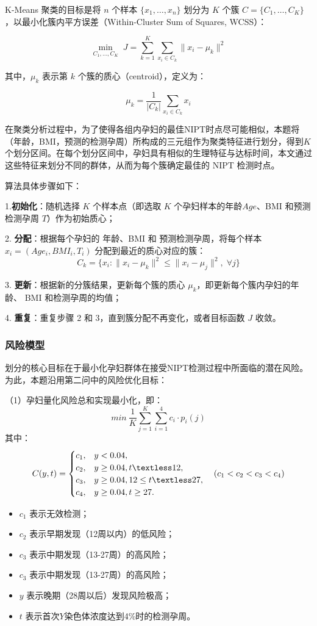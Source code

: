 \documentclass[12pt]{ctexart}
\begin{document}
	K-Means 聚类的目标是将 \(n\) 个样本 \(\{x_1, \dots, x_n\}\) 划分为 \(K\) 个簇 \(C = \{C_1, \dots, C_K\}\)，以最小化簇内平方误差（Within-Cluster Sum of Squares, WCSS）：
	
	\[
	\min_{C_1,\dots,C_K} \;
	J = \sum_{k=1}^K \sum_{x_i \in C_k} \|x_i - \mu_k\|^2
	\]
	
	其中，\(\mu_k\) 表示第 \(k\) 个簇的质心（centroid），定义为：
	
	\[
	\mu_k = \frac{1}{|C_k|}\sum_{x_i \in C_k} x_i
	\]
	
	
	在聚类分析过程中，为了使得各组内孕妇的最佳NIPT时点尽可能相似，本题将（年龄，BMI，预测的检测孕周）所构成的三元组作为聚类特征进行划分，得到$K$个划分区间。在每个划分区间中，孕妇具有相似的生理特征与达标时间，本文通过这些特征来划分不同的群体，从而为每个簇确定最佳的 NIPT 检测时点。
	
	算法具体步骤如下：
	
	1.\textbf{初始化}：随机选择 \(K\) 个样本点（即选取 \(K\) 个孕妇样本的年龄\(Age\)、BMI 和预测检测孕周 \(T\)）作为初始质心；
	
	2. \textbf{分配}：根据每个孕妇的 年龄、BMI 和 预测检测孕周，将每个样本 \(x_i = (Age_i,BMI_i, T_i)\) 分配到最近的质心对应的簇：
	\[
	C_k = \{x_i : \|x_i - \mu_k\|^2 \leq \|x_i - \mu_j\|^2, \;\forall j\}
	\]
	
	3. \textbf{更新}：根据新的分簇结果，更新每个簇的质心 \(\mu_k\)，即更新每个簇内孕妇的年龄、 BMI 和检测孕周的均值；
	
	4. \textbf{重复}：重复步骤 2 和 3，直到簇分配不再变化，或者目标函数 \(J\) 收敛。
	
	\subsubsection{风险模型}
	
	划分的核心目标在于最小化孕妇群体在接受NIPT检测过程中所面临的潜在风险。为此，本题沿用第二问中的风险优化目标：
	
	（1）孕妇量化风险总和实现最小化，即：
	\begin{equation}
		min\ \frac{1}{K}\sum_{j = 1}^{K} \sum_{i = 1}^{4}c_i \cdot p_i(j)
	\end{equation}
	其中：
	\[
	C(y,t) =
	\begin{cases}
		c_1, & y < 0.04, \\
		c_2, & y \geq 0.04 , t \textless 12, \\
		c_3, & y \geq 0.04 , 12 \le t \textless 27,\\
		c_4, & y \geq 0.04 ,  t \ge 27.
	\end{cases}
	\quad (c_1 < c_2 < c_3 < c_4)
	\]
	\begin{itemize}[noitemsep, topsep=0pt, parsep=0pt, partopsep=0pt, leftmargin=1.5em]
		\item $c_1$ 表示无效检测；
		\item $c_2$ 表示早期发现（12周以内）的低风险；
		\item $c_3$ 表示中期发现（13-27周）的高风险；
		\item $c_3$ 表示中期发现（13-27周）的高风险；
		\item $y$ 表示晚期（28周以后）发现风险极高；
		\item $t$ 表示首次$Y$染色体浓度达到4\%时的检测孕周。
	\end{itemize}
	
\end{document}
